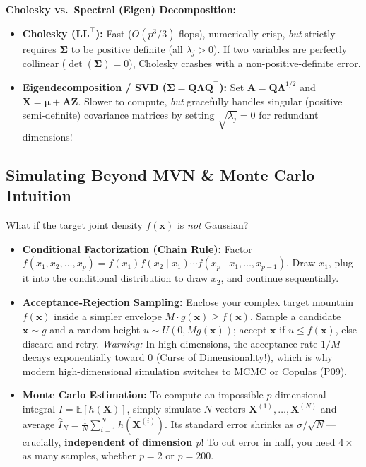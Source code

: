 \documentclass[11pt, a4paper]{article}
\begin{document}
\textbf{Cholesky vs.\ Spectral (Eigen) Decomposition:}
\begin{itemize}
    \item \textbf{Cholesky ($\mathbf{L}\mathbf{L}^\top$):} Fast ($O(p^3/3)$ flops), numerically crisp, \emph{but} strictly requires $\boldsymbol{\Sigma}$ to be positive definite (all $\lambda_j > 0$). If two variables are perfectly collinear ($\det(\boldsymbol{\Sigma}) = 0$), Cholesky crashes with a non-positive-definite error.
    \item \textbf{Eigendecomposition / SVD ($\boldsymbol{\Sigma} = \mathbf{Q}\boldsymbol{\Lambda}\mathbf{Q}^\top$):} Set $\mathbf{A} = \mathbf{Q}\boldsymbol{\Lambda}^{1/2}$ and $\mathbf{X} = \boldsymbol{\mu} + \mathbf{A}\mathbf{Z}$. Slower to compute, \emph{but} gracefully handles singular (positive semi-definite) covariance matrices by setting $\sqrt{\lambda_j} = 0$ for redundant dimensions!
\end{itemize}

\subsection{Simulating Beyond MVN \& Monte Carlo Intuition}
What if the target joint density $f(\mathbf{x})$ is \emph{not} Gaussian?
\begin{itemize}
    \item \textbf{Conditional Factorization (Chain Rule):} Factor $f(x_1, x_2, \dots, x_p) = f(x_1) f(x_2 \mid x_1) \cdots f(x_p \mid x_1, \dots, x_{p-1})$. Draw $x_1$, plug it into the conditional distribution to draw $x_2$, and continue sequentially.
    \item \textbf{Acceptance-Rejection Sampling:} Enclose your complex target mountain $f(\mathbf{x})$ inside a simpler envelope $M \cdot g(\mathbf{x}) \ge f(\mathbf{x})$. Sample a candidate $\mathbf{x} \sim g$ and a random height $u \sim U(0, M g(\mathbf{x}))$; accept $\mathbf{x}$ if $u \le f(\mathbf{x})$, else discard and retry. \emph{Warning:} In high dimensions, the acceptance rate $1/M$ decays exponentially toward $0$ (Curse of Dimensionality!), which is why modern high-dimensional simulation switches to MCMC or Copulas (P09).
    \item \textbf{Monte Carlo Estimation:} To compute an impossible $p$-dimensional integral $I = \mathbb{E}[h(\mathbf{X})]$, simply simulate $N$ vectors $\mathbf{X}^{(1)}, \dots, \mathbf{X}^{(N)}$ and average $\hat{I}_N = \frac{1}{N}\sum_{i=1}^N h(\mathbf{X}^{(i)})$. Its standard error shrinks as $\sigma / \sqrt{N}$---crucially, \textbf{independent of dimension $p$}! To cut error in half, you need $4\times$ as many samples, whether $p=2$ or $p=200$.
\end{itemize}
\end{document}
